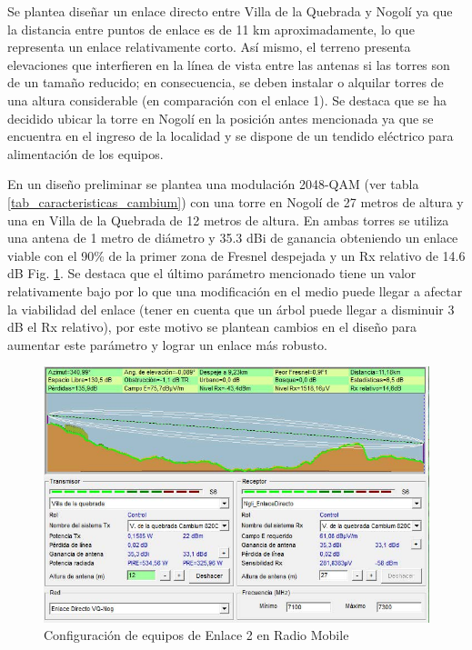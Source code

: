 \documentclass[12pt,a4paper]{book}
\begin{document}
Se plantea diseñar un enlace directo entre Villa de la Quebrada y Nogolí ya que la distancia entre puntos de enlace es de 11 km aproximadamente, lo que representa un enlace relativamente corto. Así mismo, el terreno presenta elevaciones que interfieren en la línea de vista entre las antenas si las torres son de un tamaño reducido; en consecuencia, se deben instalar o alquilar torres de una altura considerable (en comparación con el enlace 1). Se destaca que se ha decidido ubicar la torre en Nogolí en la posición antes mencionada ya que se encuentra en el ingreso de la localidad y se dispone de un tendido eléctrico para alimentación de los equipos.

En un diseño preliminar se plantea una modulación 2048-QAM (ver tabla \ref{tab_caracteristicas_cambium}) con una torre en Nogolí de 27 metros de altura y una en Villa de la Quebrada de 12 metros de altura. En ambas torres se utiliza una antena de 1 metro de diámetro y 35.3 dBi de ganancia obteniendo un enlace viable con el 90\% de la primer zona de Fresnel despejada y un Rx relativo de 14.6 dB Fig. \ref{fig_red_transporte_7}. Se destaca que el último parámetro mencionado tiene un valor relativamente bajo por lo que una modificación en el medio puede llegar a afectar la viabilidad del enlace (tener en cuenta que un árbol puede llegar a disminuir 3 dB el Rx relativo), por este motivo se plantean cambios en el diseño para aumentar este parámetro y lograr un enlace más robusto.

\begin{figure} [H]
\centering
\includegraphics[width= 12 cm]{../figuras/red_transporte_7.jpg}
\caption{Configuración de equipos de Enlace 2 en Radio Mobile}
\label{fig_red_transporte_7}
\end{figure}
\end{document}
